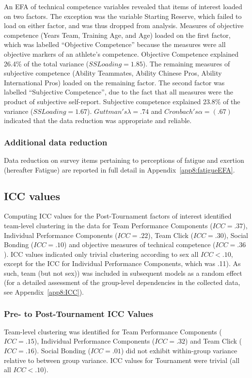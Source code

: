 \begin{CJK}{UTF8}{gbsn}
An EFA of technical competence variables revealed that items of interest loaded on two factors. The exception was the variable Starting Reserve, which failed to load on either factor, and was thus dropped from analysis. Measures of objective competence (Years Team, Training Age, and Age) loaded on the first factor, which was labelled ``Objective Competence'' because the measures were all objective markers of an athlete's competence.  Objective Competence explained 26.4\% of the total variance ($SS Loading = 1.85$). The remaining measures of subjective competence (Ability Teammates, Ability Chinese Pros, Ability International Pros) loaded on the remaining factor.  The second factor was labelled ``Subjective Competence'', due to the fact that all measures were the product of subjective self-report.  Subjective competence explained 23.8\% of the variance ($SS Loading = 1.67$). $Guttman's \lambda =.74$ and $Cronbach's \alpha = (.67)$ indicated that the data reduction was appropriate and reliable.

\subsubsection{Additional data reduction}
Data reduction on survey items pertaining to perceptions of fatigue and exertion (hereafter Fatigue) are reported in full detail in Appendix~\ref{app8:fatigueEFA}.







\subsection{ICC values}


Computing ICC values for the Post-Tournament factors of interest identified team-level clustering in the data for Team Performance Components ($ICC = .37$), Individual Performance Components ($ICC = .22$), Team Click ($ICC = .30$), Social Bonding ($ICC = .10$) and objective measures of technical competence ($ICC = .36$).  ICC values indicated only trivial clustering according to sex all $ICC < .10$, except for the ICC for Individual Performance Components, which was .11).  As such, team (but not sex)) was included in subsequent models as a random effect (for a detailed assessment of the group-level dependencies in the collected data, see Appendix~\ref{app8:ICC}).


\subsubsection{Pre- to Post-Tournament ICC Values}
Team-level clustering was identified for
Team Performance Components ($ICC = .15$), Individual Performance Components ($ICC = .32$) and Team Click ($ICC = .16$).  Social Bonding ($ICC = .01$) did not exhibit within-group variance relative to between group variance. ICC values for Tournament were trivial (all all $ICC < .10$).


\end{CJK}
